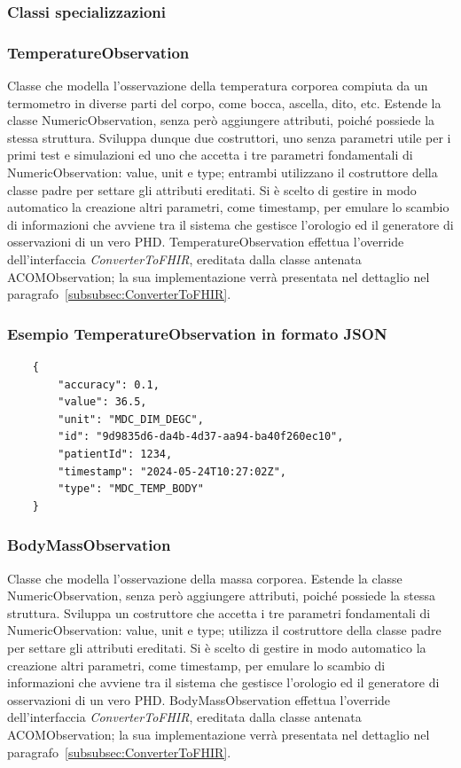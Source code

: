 \documentclass[a4paper]{article}
\begin{document}
\subsubsection{Classi specializzazioni}
\subsubsection*{TemperatureObservation}
Classe che modella l'osservazione della temperatura corporea compiuta da un termometro in diverse parti del corpo, come bocca, ascella, dito, etc.
Estende la classe NumericObservation, senza però aggiungere attributi, poiché possiede la stessa struttura. Sviluppa dunque due costruttori, uno senza parametri utile per i primi test e simulazioni ed uno che accetta i tre parametri fondamentali di NumericObservation: value, unit e type; entrambi utilizzano il costruttore della classe padre per settare gli attributi ereditati.
Si è scelto di gestire in modo automatico la creazione altri parametri, come timestamp, per emulare lo scambio di informazioni che avviene tra il sistema che gestisce l'orologio ed il generatore di osservazioni di un vero PHD.
TemperatureObservation effettua l'override dell'interfaccia \textit{ConverterToFHIR}, ereditata dalla classe antenata ACOMObservation; la sua implementazione verrà presentata nel dettaglio nel paragrafo~\ref{subsubsec:ConverterToFHIR}.
\subsubsection*{Esempio TemperatureObservation in formato JSON}
\begin{lstlisting}
    {
        "accuracy": 0.1,
        "value": 36.5,
        "unit": "MDC_DIM_DEGC",
        "id": "9d9835d6-da4b-4d37-aa94-ba40f260ec10",
        "patientId": 1234,
        "timestamp": "2024-05-24T10:27:02Z",
        "type": "MDC_TEMP_BODY"
    }
\end{lstlisting}
\subsubsection*{BodyMassObservation}
Classe che modella l'osservazione della massa corporea.
Estende la classe NumericObservation, senza però aggiungere attributi, poiché possiede la stessa struttura.
Sviluppa un costruttore che accetta i tre parametri fondamentali di NumericObservation: value, unit e type; utilizza il costruttore della classe padre per settare gli attributi ereditati.
Si è scelto di gestire in modo automatico la creazione altri parametri, come timestamp, per emulare lo scambio di informazioni che avviene tra il sistema che gestisce l'orologio ed il generatore di osservazioni di un vero PHD.
BodyMassObservation effettua l'override dell'interfaccia \textit{ConverterToFHIR}, ereditata dalla classe antenata ACOMObservation; la sua implementazione verrà presentata nel dettaglio nel paragrafo~\ref{subsubsec:ConverterToFHIR}.
\end{document}
